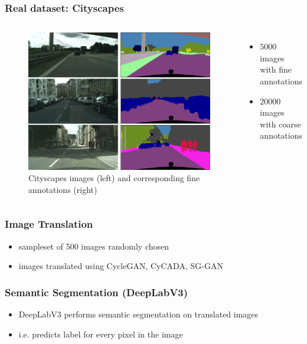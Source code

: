 \documentclass{beamer}
\begin{document}
\begin{frame}
\frametitle{Real dataset: Cityscapes}
\begin{columns}[c]
	\begin{figure}
		\centering
		\includegraphics[width=\textwidth]{../images/cityscapes_example.png}
		\caption[Cityscapes images]{Cityscapes images (left) and corresponding fine annotations (right)}
	\end{figure}
	\begin{itemize}
		\item $5000$ images with fine annotations
		\item $20000$ images with coarse annotations
	\end{itemize}
\end{columns}
\end{frame}

\begin{frame}
\frametitle{Image Translation}
\begin{itemize}
	\item sampleset of 500 images randomly chosen
	\item images translated using CycleGAN, CyCADA, SG-GAN
\end{itemize}
\end{frame}

\begin{frame}
\frametitle{Semantic Segmentation (DeepLabV3)}
\begin{itemize}
	\item DeepLabV3 performs semantic segmentation on translated images
	\item i.e. predicts label for every pixel in the image
\end{itemize}
\end{frame}
\end{document}
